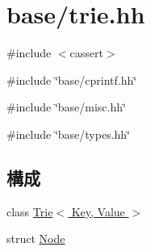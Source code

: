 \hypertarget{trie_8hh}{
\section{base/trie.hh}
\label{trie_8hh}
}
{\ttfamily \#include $<$cassert$>$}\par
{\ttfamily \#include \char`\"{}base/cprintf.hh\char`\"{}}\par
{\ttfamily \#include \char`\"{}base/misc.hh\char`\"{}}\par
{\ttfamily \#include \char`\"{}base/types.hh\char`\"{}}\par
\subsection*{構成}
\begin{DoxyCompactItemize}
\item 
class \hyperlink{classTrie}{Trie$<$ Key, Value $>$}
\item 
struct \hyperlink{structTrie_1_1Node}{Node}
\end{DoxyCompactItemize}
